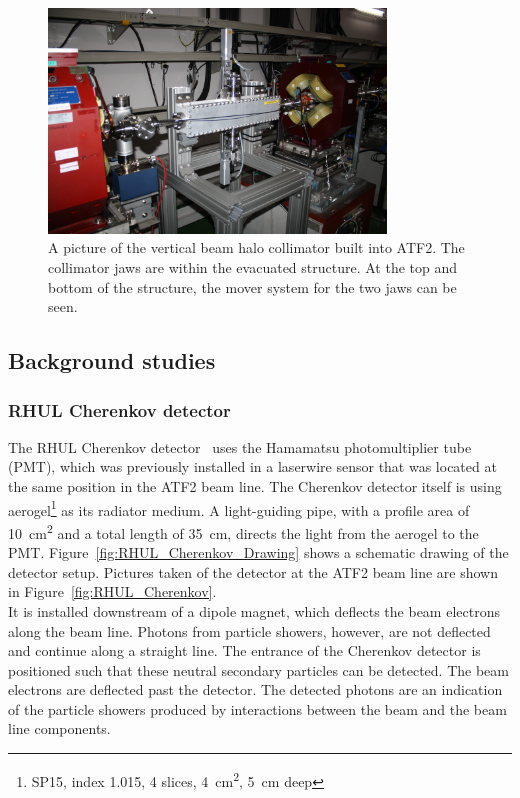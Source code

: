 \begin{figure}
\centering
\includegraphics[width=0.8\textwidth]{Figures/ATF/Installed_Collimator.jpg}
\caption[Picture of the installed beam halo collimator]{A picture of the vertical beam halo collimator built into ATF2. 
The collimator jaws are within the evacuated structure. 
At the top and bottom of the structure, the mover system for the two jaws can be seen.}
\label{fig:installed_collimator}
\end{figure}

\subsection{Background studies}
\subsubsection{RHUL Cherenkov detector}
\label{RHUL}

The RHUL Cherenkov detector~\cite{RHUL_detector_wiki} uses the Hamamatsu photomultiplier tube (PMT), which was previously installed in a laserwire sensor that was located at the same position in the ATF2 beam line. 
The Cherenkov detector itself is using aerogel\footnote{SP15, index 1.015, 4 slices, \SI{4}{\centi\meter\squared}, \SI{5}{\centi\meter} deep} as its radiator medium. 
A light-guiding pipe, with a profile area of \SI{10}{\centi\metre\squared} and a total length of \SI{35}{\centi\metre}, directs the light from the aerogel to the PMT.
Figure~\ref{fig:RHUL_Cherenkov_Drawing} shows a schematic drawing of the detector setup.
Pictures taken of the detector at the ATF2 beam line are shown in Figure~\ref{fig:RHUL_Cherenkov}.
\\It is installed downstream of a dipole magnet, which deflects the beam electrons along the beam line.
Photons from particle showers, however, are not deflected and continue along a straight line.
The entrance of the Cherenkov detector is positioned such that these neutral secondary particles can be detected.
The beam electrons are deflected past the detector.
The detected photons are an indication of the particle showers produced by interactions between the beam and the beam line components.

